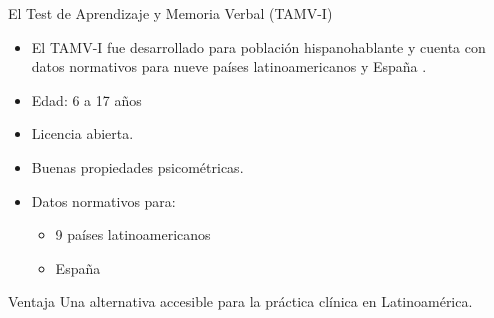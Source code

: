 \documentclass[aspectratio=169]{beamer}
\begin{document}
\begin{frame}{El Test de Aprendizaje y Memoria Verbal (TAMV-I)}
	
	\begin{itemize}
		\item El TAMV-I fue desarrollado para población hispanohablante y cuenta con datos normativos para nueve países latinoamericanos y España \citep{rivera2017}.
		\vspace{7pt}
		\item Edad: 6 a 17 años
		\vspace{7pt}
		\item Licencia abierta.
		\vspace{7pt}
		\item Buenas propiedades psicométricas.
		\vspace{7pt}
		\item Datos normativos para:
		\begin{itemize}
			\item 9 países latinoamericanos
			\item España
		\end{itemize}
	\end{itemize}
	
	\vspace{0.4cm}
	
	\begin{block}{Ventaja}
		Una alternativa accesible para la práctica clínica en Latinoamérica.
	\end{block}
	
\end{frame}
\end{document}
